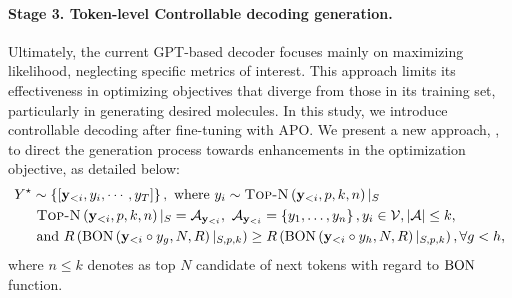 \paragraph{Stage 3. Token-level Controllable decoding generation.}\label{decoding_strategy}
Ultimately, the current GPT-based decoder focuses mainly on maximizing likelihood, neglecting specific metrics of interest. This approach limits its effectiveness in optimizing objectives that diverge from those in its training set, particularly in generating desired molecules. In this study, we introduce controllable decoding after fine-tuning with APO. We present a new approach, \TOPN, to direct the generation process towards enhancements in the optimization objective, as detailed below:
\begin{align}\label{eq:topN}
Y^{\star}&\sim\left\{[\mathbf{y}_{<i},y_i,\cdots,y_{T}]\right\}, 
\text{~where~} y_i\sim \text{\textsc{Top-N}} \left( {\mathbf{y}_{<i}, p,k, n} \right) |_{S}  \\ \notag
    &\text{~\textsc{Top-N}} \left( {\mathbf{y}_{<i}, p,k, n} \right) |_{S}= \mathcal{A}_{\mathbf{y}_{<i}}, 
    \text{~} \mathcal{A}_{\mathbf{y}_{<i}}=\left\{y_1,\ldots,y_{n}\right\}, y_i\in \mathcal{V}, |\mathcal{A}|\leq k, \notag \\ \notag
    &\text{~and } 
    R \left( {\text{{{BON}}} \left( {\mathbf{y}_{<i}\circ y_g,N,R} \right) |_{S,p,k}} \right) 
    \geq R \left( {\text{{{BON}}} \left( {\mathbf{y}_{<i}\circ y_h,N,R} \right) |_{S,p,k}} \right) , \forall g<h, \notag
\end{align}
where $n\leq k$ denotes as top $N$ candidate of next tokens with regard to $\text{{{BON}}}$ function.




